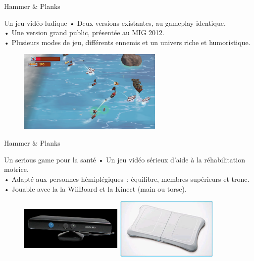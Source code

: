 \documentclass{beamer}
\begin{document}
		\begin{frame}{Hammer \& Planks}
			\begin{exampleblock}{Un jeu vidéo ludique}
				• Deux versions existantes, au gameplay identique.\\
				• Une version grand public, présentée au MIG 2012.\\
				• Plusieurs modes de jeu, différents ennemis et un univers riche et humoristique.
			\end{exampleblock}	
			\begin{figure}
				\centering
				\includegraphics[width=7cm]{../images/hammer_and_planks.png}
			\end{figure}
		\end{frame}
		
		\begin{frame}{Hammer \& Planks}
			\begin{alertblock}{Un serious game pour la santé}
				• Un jeu vidéo sérieux d'aide à la réhabilitation motrice.\\
				• Adapté aux personnes hémiplégiques~: équilibre, membres supérieurs et tronc.\\
				• Jouable avec la la WiiBoard et la Kinect (main ou torse).
			\end{alertblock}
			\begin{figure}
				\centering
				\includegraphics[width=5cm, height=3cm]{../images/kinect.png}
				\includegraphics[width=5cm, height=3cm]{../images/wiiboard.png}
			\end{figure}			
		\end{frame}
\end{document}
